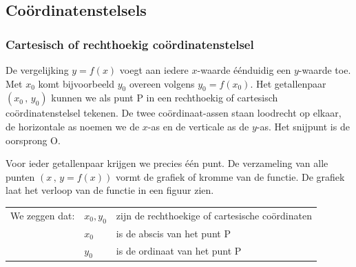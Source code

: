 


\subsection{Co\"ordinatenstelsels}


\subsubsection{Cartesisch of rechthoekig co\"ordinatenstelsel}

De vergelijking $y=f(x)$ voegt aan iedere $x$-waarde \'e\'enduidig een
$y$-waarde toe. Met $x_{0}$ komt bijvoorbeeld $y_{0}$ overeen volgens
$y_{0}=f(x_{0})$. Het getallenpaar $(x_{0}\,,\,y_{0})$ kunnen we
als punt P in een rechthoekig of cartesisch co\"ordinatenstelsel tekenen.
De twee co\"ordinaat-assen staan loodrecht op elkaar, de horizontale
as noemen we de $x$-as en de verticale as de $y$-as. Het snijpunt is de
oorsprong O.

Voor ieder getallenpaar krijgen we precies \'e\'en punt. De
verzameling van alle punten $(x\,,\,y=f(x))$ vormt de grafiek of
kromme van de functie. De grafiek laat het verloop van de functie
in een figuur zien.


\begin{tabel*}{}
	\centering
\begin{tabular}{cll}
	We zeggen dat: & $x_{0},y_{0}$  & zijn de rechthoekige of cartesische co\"ordinaten\\
	& $x_{0}$  & is de abscis van het punt P\\
	& $y_{0}$ & is de ordinaat van het punt P\\
\end{tabular}
\end{tabel*}

